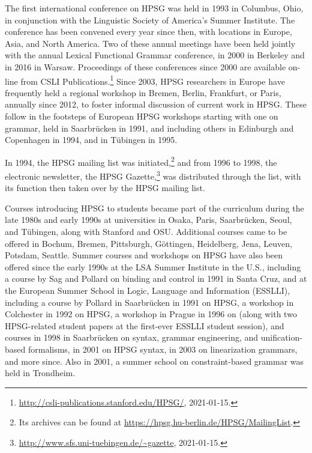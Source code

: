 \documentclass[output=paper
 	        ,biblatex
                ,babelshorthands
                ,newtxmath
                ,draftmode
                ,colorlinks, citecolor=brown
]{langscibook}
\begin{document}
The first international conference on HPSG was held in 1993 in Columbus, Ohio, in conjunction with the Linguistic Society of America's Summer Institute.  The conference has been convened every year since then, with locations in Europe, Asia, and North America.  Two of these annual meetings have been held jointly with the annual Lexical Functional Grammar conference, in 2000 in Berkeley and in 2016 in Warsaw.  Proceedings of these conferences since 2000 are available on-line from CSLI Publications.\footnote{\url{http://csli-publications.stanford.edu/HPSG/}, 2021-01-15.}  Since 2003, HPSG researchers in Europe have frequently held a regional workshop in Bremen, Berlin, Frankfurt, or Paris, annually since 2012, to foster informal discussion of current work in HPSG.  These follow in the footsteps of European HPSG workshops starting with one on  grammar, held in Saarbrücken in 1991, and including others in Edinburgh and Copenhagen in 1994, and in Tübingen in 1995.

In 1994, the HPSG mailing list was initiated,\footnote{Its archives can be found at \url{https://hpsg.hu-berlin.de/HPSG/MailingList}.} and from 1996 to 1998, the electronic newsletter, the HPSG Gazette,\footnote{\url{http://www.sfs.uni-tuebingen.de/~gazette}, 2021-01-15.} was distributed through the list, with its function then taken over by the HPSG mailing list.

Courses introducing HPSG to students became part of the curriculum during the late 1980s and early
1990s at universities in Osaka, Paris, Saarbrücken, Seoul, and Tübingen, along with Stanford
and OSU.  Additional courses came to be offered in Bochum, Bremen, Pittsburgh, Göttingen,
Heidelberg, Jena, Leuven, Potsdam, Seattle.  Summer courses and workshops on HPSG have also been offered since the early 1990s at the LSA Summer Institute in the U.S., including a course by Sag and Pollard on binding and control in 1991 in Santa Cruz, and at the European Summer School in Logic, Language and Information (ESSLLI), including a course by Pollard in Saarbrücken in 1991 on HPSG, a workshop in Colchester in 1992 on HPSG, a workshop in Prague in 1996 on  (along with two HPSG-related student papers at the first-ever ESSLLI student session), and courses in 1998 in Saarbrücken on  syntax, grammar engineering, and unification-based formalisms, in 2001 on HPSG syntax, in 2003 on linearization grammars, and more since.  Also in 2001, a  summer school on constraint-based grammar was held in Trondheim.
\end{document}
